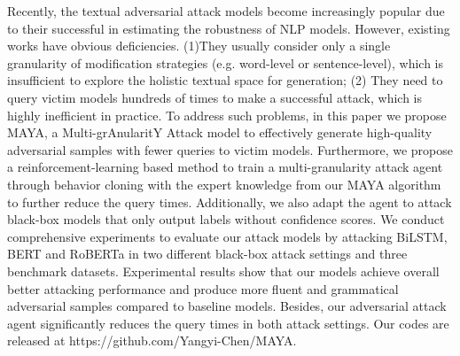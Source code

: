 Recently, the textual adversarial attack models become increasingly popular due to their successful in estimating the robustness of NLP models. However, existing works have obvious deficiencies. (1)They usually consider only a single granularity of modification strategies (e.g. word-level or sentence-level), which is insufficient to explore the holistic textual space for generation;  (2) They need to query victim models hundreds of times to make a successful attack, which is highly inefficient in practice. To address such problems, in this paper we propose MAYA, a Multi-grAnularitY Attack model to effectively generate high-quality adversarial samples with fewer queries to victim models.  Furthermore, we propose a reinforcement-learning based method to train a multi-granularity attack agent through behavior cloning with the expert knowledge from our MAYA algorithm to further reduce the query times. Additionally, we also adapt the agent to attack black-box models that only output labels without confidence scores. We conduct comprehensive experiments to evaluate our attack models by attacking BiLSTM, BERT and RoBERTa in two different black-box attack settings and three benchmark datasets. Experimental results show that our models achieve overall better attacking performance and produce more fluent and grammatical adversarial samples compared to baseline models. Besides, our adversarial attack agent significantly reduces the query times in both attack settings. Our codes are released at https://github.com/Yangyi-Chen/MAYA.
